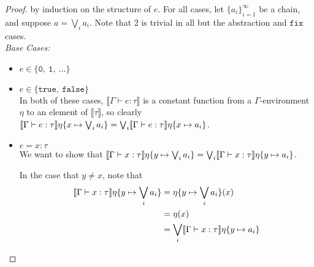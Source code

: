 \begin{proof}
by induction on the structure of $e$. For all cases, let $\{ a_i \}^{\infty}_{i=1}$ be a chain, and suppose $ a = \bigvee_i a_i$. 
Note that 2 is trivial in all but the abstraction and $\texttt{fix}$ cases.\\
 \emph{Base Cases: } 
 \begin{itemize}
 \item $e \in \{ \texttt{0}, \ \texttt{1}, \ \ldots \}$
 \item $e \in \{ \texttt{true}, \ \texttt{false} \}$\\ 
  In both of these cases, $\llbracket \Gamma \vdash e : \tau \rrbracket$ is a constant function from a $\Gamma$-environment
 $\eta$ to an element of $\llbracket \tau \rrbracket$, so clearly $\llbracket{{\Gamma}\vdash{e}:{\tau}}\rrbracket{\eta\{{x}\mapsto{\bigvee_i a_i}\}} =
\bigvee_i\llbracket{{\Gamma}\vdash{e}:{\tau}}\rrbracket{\eta\{{x}\mapsto{a_i}\}}$.

 \item $e = x : \tau$ \\ 
 We want to show that $\llbracket{{\Gamma}\vdash{x}:{\tau}}\rrbracket{\eta\{{y}\mapsto{\bigvee_i a_i}\}} =
\bigvee_i\llbracket{{\Gamma}\vdash{x}:{\tau}}\rrbracket{\eta\{{y}\mapsto{a_i}\}}$.

In the case that $ y \neq x$, note that
\begin{align*}
\llbracket{{\Gamma}\vdash{x}:{\tau}}\rrbracket{\eta\{{y}\mapsto{\bigvee_i a_i}\}} &= \eta\{y\mapsto \bigvee_i a_i\}(x) \\
&= \eta (x) \\
&= \bigvee_i\llbracket{{\Gamma}\vdash{x}:{\tau}}\rrbracket{\eta\{{y}\mapsto{a_i}\}}
\end{align*}


\end{itemize}
\end{proof}
